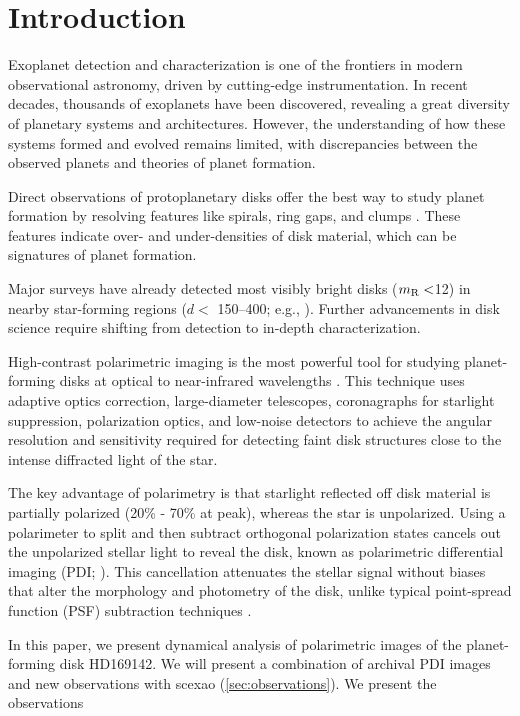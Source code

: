 \section{Introduction\label{sec:introduction}}


Exoplanet detection and characterization is one of the frontiers in modern observational astronomy, driven by cutting-edge instrumentation. In recent decades, thousands of exoplanets have been discovered, revealing a great diversity of planetary systems and architectures. However, the understanding of how these systems formed and evolved remains limited, with discrepancies between the observed planets and theories of planet formation. 

Direct observations of protoplanetary disks offer the best way to study planet formation by resolving features like spirals, ring gaps, and clumps \citep{andrews_observations_2020,benisty_optical_2023}. These features indicate over- and under-densities of disk material, which can be signatures of planet formation.

Major surveys have already detected most visibly bright disks ($m_{\text R}<$12) in nearby star-forming regions ($d <$ \SIrange{150}{400}{\parsec}; e.g., \citealt{avenhaus_disks_2018,garufi_disks_2020,rich_gemini-lights_2022,ren_protoplanetary_2023,valegard_sphere_2024,ginski_sphere_2024,garufi_sphere_2024}). Further advancements in disk science require shifting from detection to in-depth characterization.

High-contrast polarimetric imaging is the most powerful tool for studying planet-forming disks at optical to near-infrared wavelengths \citep{benisty_optical_2023}. This technique uses adaptive optics correction, large-diameter telescopes, coronagraphs for starlight suppression, polarization optics, and low-noise detectors to achieve the angular resolution and sensitivity required for detecting faint disk structures close to the intense diffracted light of the star.

The key advantage of polarimetry is that starlight reflected off disk material is partially polarized (20\% - 70\% at peak), whereas the star is unpolarized. Using a polarimeter to split and then subtract orthogonal polarization states cancels out the unpolarized stellar light to reveal the disk, known as polarimetric differential imaging (PDI; \citealt{kuhn_imaging_2001}). This cancellation attenuates the stellar signal without biases that alter the morphology and photometry of the disk, unlike typical point-spread function (PSF) subtraction techniques \citep{soummer_detection_2012,benisty_optical_2023}.

In this paper, we present dynamical analysis of polarimetric images of the planet-forming disk HD169142. We will present a combination of archival PDI images and new observations with scexao (\autoref{sec:observations}). We present the observations 